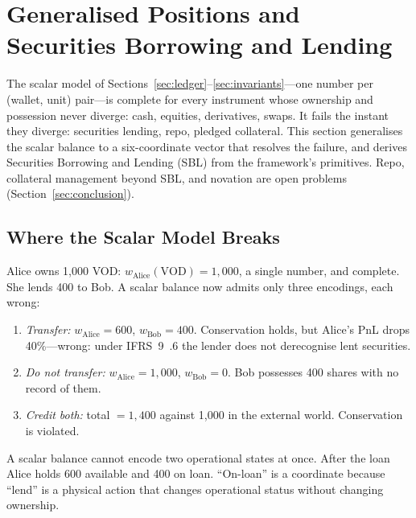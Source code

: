 \section{Generalised Positions and Securities Borrowing and Lending}
\label{sec:sec16}
\label{sec:gpm}

The scalar model of Sections~\ref{sec:ledger}--\ref{sec:invariants}---one number per (wallet, unit) pair---is complete for every instrument whose ownership and possession never diverge: cash, equities, derivatives, swaps. It fails the instant they diverge: securities lending, repo, pledged collateral. This section generalises the scalar balance to a six-coordinate vector that resolves the failure, and derives Securities Borrowing and Lending (SBL) from the framework's primitives. Repo, collateral management beyond SBL, and novation are open problems (Section~\ref{sec:conclusion}).

\subsection{Where the Scalar Model Breaks}
\label{sec:scalar-breaks}

Alice owns 1{,}000 VOD: $w_{\mathrm{Alice}}(\text{VOD}) = 1{,}000$, a single number, and complete. She lends 400 to Bob. A scalar balance now admits only three encodings, each wrong:

\begin{enumerate}[nosep]
\item \emph{Transfer:} $w_{\mathrm{Alice}} = 600$, $w_{\mathrm{Bob}} = 400$. Conservation holds, but Alice's PnL drops 40\%---wrong: under IFRS~9~.6 the lender does not derecognise lent securities.
\item \emph{Do not transfer:} $w_{\mathrm{Alice}} = 1{,}000$, $w_{\mathrm{Bob}} = 0$. Bob possesses 400 shares with no record of them.
\item \emph{Credit both:} total $= 1{,}400$ against 1{,}000 in the external world. Conservation is violated.
\end{enumerate}

A scalar balance cannot encode two operational states at once. After the loan Alice holds 600 available and 400 on loan. ``On-loan'' is a coordinate because ``lend'' is a physical action that changes operational status without changing ownership.

